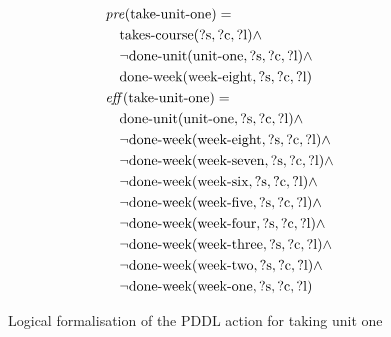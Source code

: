 \begin{figure}[t]
  \small  %
  \begin{align*}
  &\mathit{pre}(\text{take-unit-one}) = \\
  &\quad \text{takes-course}(\text{?s}, \text{?c}, \text{?l}) \land \\
  &\quad \lnot \text{done-unit}(\text{unit-one}, \text{?s}, \text{?c}, \text{?l}) \land \\
  &\quad \text{done-week}(\text{week-eight}, \text{?s}, \text{?c}, \text{?l}) \\
  &\mathit{eff}(\text{take-unit-one}) = \\
  &\quad \text{done-unit}(\text{unit-one}, \text{?s}, \text{?c}, \text{?l}) \land \\
  &\quad \lnot \text{done-week}(\text{week-eight}, \text{?s}, \text{?c}, \text{?l}) \land \\
  &\quad \lnot \text{done-week}(\text{week-seven}, \text{?s}, \text{?c}, \text{?l}) \land \\
  &\quad \lnot \text{done-week}(\text{week-six}, \text{?s}, \text{?c}, \text{?l}) \land \\
  &\quad \lnot \text{done-week}(\text{week-five}, \text{?s}, \text{?c}, \text{?l}) \land \\
  &\quad \lnot \text{done-week}(\text{week-four}, \text{?s}, \text{?c}, \text{?l}) \land \\
  &\quad \lnot \text{done-week}(\text{week-three}, \text{?s}, \text{?c}, \text{?l}) \land \\
  &\quad \lnot \text{done-week}(\text{week-two}, \text{?s}, \text{?c}, \text{?l}) \land \\
  &\quad \lnot \text{done-week}(\text{week-one}, \text{?s}, \text{?c}, \text{?l})
  \end{align*}
  \caption{Logical formalisation of the PDDL action for taking unit one}
  \label{fig:take-unit-one}
  \end{figure}